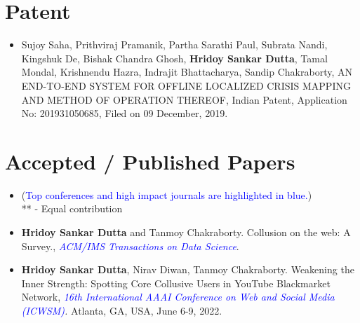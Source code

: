 \documentclass[margin, centered]{res}
\begin{document}
\begin{resume}
\section{Patent}
\begin{itemize}[leftmargin=*]

\item Sujoy Saha,  Prithviraj Pramanik,  Partha Sarathi Paul,  Subrata Nandi,  Kingshuk De,  Bishak Chandra Ghosh,  \textbf{Hridoy Sankar Dutta},  Tamal Mondal,  Krishnendu Hazra,  Indrajit Bhattacharya,  Sandip Chakraborty,  AN END-TO-END SYSTEM FOR OFFLINE LOCALIZED CRISIS MAPPING AND METHOD OF OPERATION THEREOF,  Indian Patent,  Application No: 201931050685,  Filed on 09 December, 2019.

\end{itemize}




\section{Accepted / Published Papers}
\begin{itemize}[leftmargin=*]
\item[] (\textcolor{blue}{Top conferences and high impact journals are highlighted in blue.}) \\ ** - Equal contribution

\item \textbf{Hridoy Sankar Dutta} and Tanmoy Chakraborty. Collusion on the web: A Survey.,  \textit{\textcolor{blue}{ACM/IMS Transactions on Data Science}}.  

\item \textbf{Hridoy Sankar Dutta}, Nirav Diwan, Tanmoy Chakraborty. Weakening the Inner Strength: Spotting Core Collusive Users in YouTube Blackmarket Network,  \textit{\textcolor{blue}{16th International AAAI Conference on Web and Social Media (ICWSM)}.} Atlanta, GA, USA, June 6-9, 2022.  


\end{itemize}
\end{resume}
\end{document}
